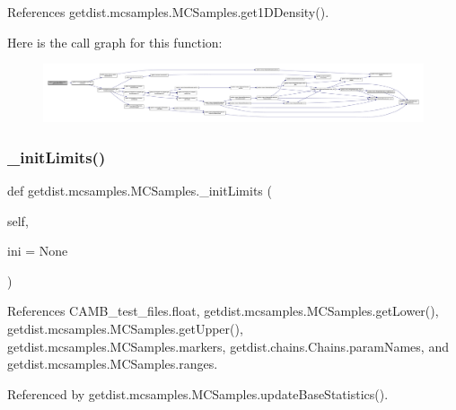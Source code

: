References getdist.\+mcsamples.\+M\+C\+Samples.\+get1\+D\+Density().

Here is the call graph for this function\+:
\nopagebreak
\begin{figure}[H]
\begin{center}
\leavevmode
\includegraphics[width=350pt]{classgetdist_1_1mcsamples_1_1MCSamples_a1d4ac9d66e1401a3a2e082cd18393f2b_cgraph}
\end{center}
\end{figure}
\mbox{\label{classgetdist_1_1mcsamples_1_1MCSamples_a33b6439bd4c616568c29c628ed3e75f1}} 
\subsubsection{\texorpdfstring{\+\_\+init\+Limits()}{\_initLimits()}}
{\footnotesize\ttfamily def getdist.\+mcsamples.\+M\+C\+Samples.\+\_\+init\+Limits (\begin{DoxyParamCaption}\item[{}]{self,  }\item[{}]{ini = {\ttfamily None} }\end{DoxyParamCaption})\hspace{0.3cm}{\ttfamily [private]}}



References C\+A\+M\+B\+\_\+test\+\_\+files.\+float, getdist.\+mcsamples.\+M\+C\+Samples.\+get\+Lower(), getdist.\+mcsamples.\+M\+C\+Samples.\+get\+Upper(), getdist.\+mcsamples.\+M\+C\+Samples.\+markers, getdist.\+chains.\+Chains.\+param\+Names, and getdist.\+mcsamples.\+M\+C\+Samples.\+ranges.



Referenced by getdist.\+mcsamples.\+M\+C\+Samples.\+update\+Base\+Statistics().

